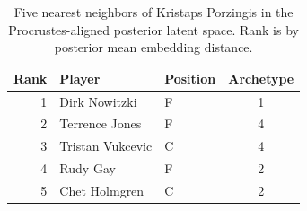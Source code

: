 \begin{table}[htbp]
  \centering\small
  \begin{tabular}{rllc}
    \toprule
    Rank & Player & Position & Archetype \\
    \midrule
    1 & Dirk Nowitzki & F & 1 \\
    2 & Terrence Jones & F & 4 \\
    3 & Tristan Vukcevic & C & 4 \\
    4 & Rudy Gay & F & 2 \\
    5 & Chet Holmgren & C & 2 \\
    \bottomrule
  \end{tabular}
  \caption{Five nearest neighbors of Kristaps Porzingis in the Procrustes-aligned posterior latent space. Rank is by posterior mean embedding distance.}
  \label{tab:Kristaps_Porzingis_neighbors}
\end{table}

